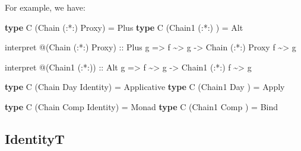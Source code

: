 \documentclass[]{article}
\newenvironment{Shaded}{}{}
\newcommand{\DataTypeTok}[1]{\textcolor[rgb]{0.56,0.13,0.00}{#1}}
\newcommand{\KeywordTok}[1]{\textcolor[rgb]{0.00,0.44,0.13}{\textbf{#1}}}
\newcommand{\NormalTok}[1]{#1}
\newcommand{\OperatorTok}[1]{\textcolor[rgb]{0.40,0.40,0.40}{#1}}
\newcommand{\OtherTok}[1]{\textcolor[rgb]{0.00,0.44,0.13}{#1}}
\begin{document}
\begin{itemize}
  For example, we have:

\begin{Shaded}
\begin{Highlighting}[]
\KeywordTok{type} \DataTypeTok{C}\NormalTok{ (}\DataTypeTok{Chain}\NormalTok{  (}\OperatorTok{:*:}\NormalTok{) }\DataTypeTok{Proxy}\NormalTok{) }\OtherTok{=} \DataTypeTok{Plus}
\KeywordTok{type} \DataTypeTok{C}\NormalTok{ (}\DataTypeTok{Chain1}\NormalTok{ (}\OperatorTok{:*:}\NormalTok{)      ) }\OtherTok{=} \DataTypeTok{Alt}

\NormalTok{interpret }\OperatorTok{@}\NormalTok{(}\DataTypeTok{Chain}\NormalTok{ (}\OperatorTok{:*:}\NormalTok{) }\DataTypeTok{Proxy}\NormalTok{)}
\OtherTok{    ::} \DataTypeTok{Plus}\NormalTok{ g}
    \OtherTok{=>}\NormalTok{ f }\OperatorTok{\textasciitilde{}>}\NormalTok{ g}
    \OtherTok{{-}>} \DataTypeTok{Chain}\NormalTok{ (}\OperatorTok{:*:}\NormalTok{) }\DataTypeTok{Proxy}\NormalTok{ f }\OperatorTok{\textasciitilde{}>}\NormalTok{ g}

\NormalTok{interpret }\OperatorTok{@}\NormalTok{(}\DataTypeTok{Chain1}\NormalTok{ (}\OperatorTok{:*:}\NormalTok{))}
\OtherTok{    ::} \DataTypeTok{Alt}\NormalTok{ g}
    \OtherTok{=>}\NormalTok{ f }\OperatorTok{\textasciitilde{}>}\NormalTok{ g}
    \OtherTok{{-}>} \DataTypeTok{Chain1}\NormalTok{ (}\OperatorTok{:*:}\NormalTok{) f }\OperatorTok{\textasciitilde{}>}\NormalTok{ g}

\KeywordTok{type} \DataTypeTok{C}\NormalTok{ (}\DataTypeTok{Chain}  \DataTypeTok{Day} \DataTypeTok{Identity}\NormalTok{) }\OtherTok{=} \DataTypeTok{Applicative}
\KeywordTok{type} \DataTypeTok{C}\NormalTok{ (}\DataTypeTok{Chain1} \DataTypeTok{Day}\NormalTok{         ) }\OtherTok{=} \DataTypeTok{Apply}

\KeywordTok{type} \DataTypeTok{C}\NormalTok{ (}\DataTypeTok{Chain}  \DataTypeTok{Comp} \DataTypeTok{Identity}\NormalTok{) }\OtherTok{=} \DataTypeTok{Monad}
\KeywordTok{type} \DataTypeTok{C}\NormalTok{ (}\DataTypeTok{Chain1} \DataTypeTok{Comp}\NormalTok{         ) }\OtherTok{=} \DataTypeTok{Bind}
\end{Highlighting}
\end{Shaded}
\end{itemize}

\hypertarget{identityt}{%
\subsection{IdentityT}\label{identityt}}
\end{document}
